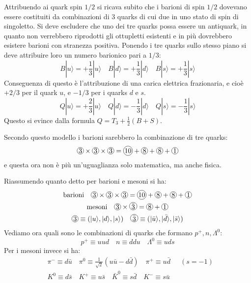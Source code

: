Attribuendo ai quark spin $1/2$ si ricava subito che i barioni di spin $1/2$ dovevano essere costituiti da
combinazioni di 3 quarks di cui due in uno stato di spin di singoletto.
Si deve escludere che uno dei tre quarks possa essere un antiquark, in quanto non verrebbero riprodotti
gli ottupletti esistenti e in più dovrebbero esistere barioni con stranezza positiva.
Ponendo i tre quarks sullo stesso piano si deve attribuire loro un numero barionico pari a $1/3$:
\begin{equation}
B|u\rangle=+\frac{1}{3}|u\rangle\quad B|d\rangle=+\frac{1}{3}|d\rangle\quad
B|s\rangle=+\frac{1}{3}|s\rangle
\end{equation}
Conseguenza di questo è l'attribuzione di una carica elettrica frazionaria, e cioè $+2/3$ per il quark $u$, e
$-1/3$ per i quarks $d$ e $s$.
\begin{equation}
Q|u\rangle=+\frac{2}{3}|u\rangle\quad Q|d\rangle=-\frac{1}{3}|d\rangle\quad Q|s\rangle=-\frac{1}{3}|s\rangle
\end{equation}
Questo si evince dalla formula $Q=T_3+\frac{1}{2}(B+S)$.

Secondo questo modello i barioni sarebbero la combinazione di tre quarks:
\[
\Ci{3}\times\Ci{3}\times\Ci{3}=\Ci{10}+\Ci{8}+\Ci{8}+\Ci{1}
\]
e questa ora non è più un'uguaglianza solo matematica, ma anche fisica.

 Riassumendo quanto detto per barioni e mesoni si ha:
\begin{gather}
\text{barioni}\quad \Ci{3}\times\Ci{3}\times\Ci{3}=\Ci{10}+\Ci{8}+\Ci{8}+\Ci{1}\\
\text{mesoni} \quad \Ci{3}\times\Ci{$\bar{3}$}=\Ci{8}+\Ci{1}\\
\Ci{3}\equiv(|u\rangle,|d\rangle,|s\rangle)\quad \Ci{$\bar{3}$}\equiv(|\bar{u}\rangle,|\bar{d}\rangle,|\bar{s}\rangle)
\end{gather}
Vediamo ora quali sono le combinazioni di quarks che formano $p^+,n,\Lambda^0$:
\begin{equation}
p^+\equiv uud\quad n\equiv ddu\quad \Lambda^0\equiv uds
\end{equation}
Per i mesoni invece si ha:
\begin{equation}
\begin{split}
&\pi^-\equiv d\bar{u}\quad \pi^0\equiv\frac{1}{\sqrt{2}}(u\bar{u}-d\bar{d})\quad \pi^+\equiv u\bar{d}\quad\;\,(s=-1)\\
&K^0\equiv d\bar{s}\quad K^+\equiv u\bar{s}\quad \bar{K}^0\equiv s\bar{d}\quad K^-\equiv s\bar{u}
\end{split}
\end{equation}

